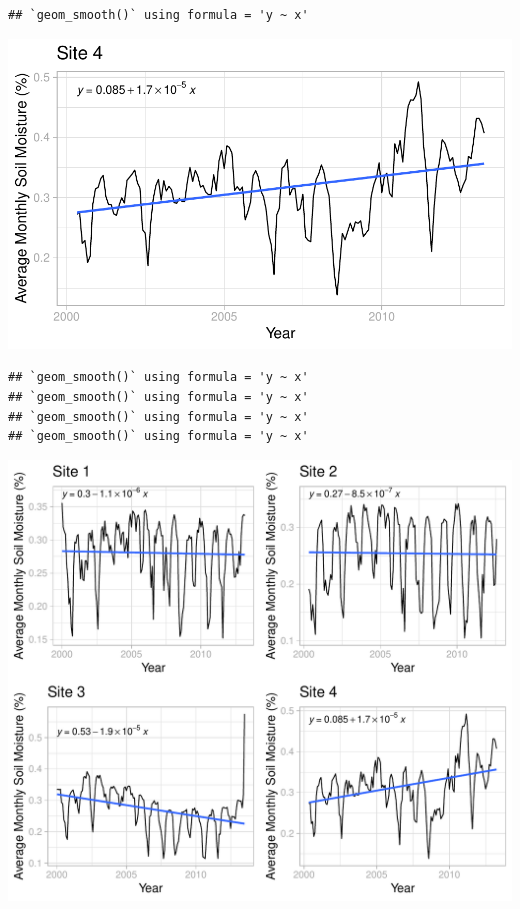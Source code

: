 \documentclass[
  12pt,
]{article}
\begin{document}
\begin{verbatim}
## `geom_smooth()` using formula = 'y ~ x'
\end{verbatim}

\includegraphics{Project_Template_files/figure-latex/Average Monthly Soil Moisture Plots-4.pdf}

\begin{verbatim}
## `geom_smooth()` using formula = 'y ~ x'
## `geom_smooth()` using formula = 'y ~ x'
## `geom_smooth()` using formula = 'y ~ x'
## `geom_smooth()` using formula = 'y ~ x'
\end{verbatim}

\includegraphics{Project_Template_files/figure-latex/Average Monthly Soil Moisture Cowplot-1.pdf}
\end{document}
